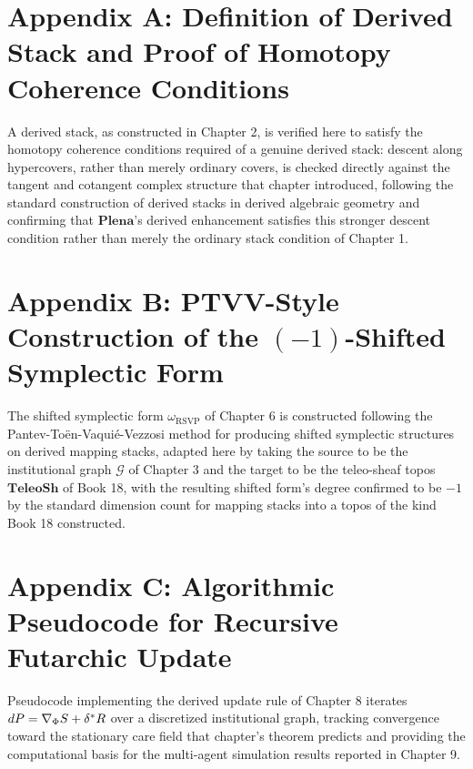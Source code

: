 \chapter*{Appendix A: Definition of Derived Stack and Proof of Homotopy Coherence Conditions}

A derived stack, as constructed in Chapter 2, is verified here to satisfy the homotopy coherence conditions required of a genuine derived stack: descent along hypercovers, rather than merely ordinary covers, is checked directly against the tangent and cotangent complex structure that chapter introduced, following the standard construction of derived stacks in derived algebraic geometry and confirming that $\mathbf{Plena}$'s derived enhancement satisfies this stronger descent condition rather than merely the ordinary stack condition of Chapter 1.

\chapter*{Appendix B: PTVV-Style Construction of the $(-1)$-Shifted Symplectic Form}

The shifted symplectic form $\omega_{\mathrm{RSVP}}$ of Chapter 6 is constructed following the Pantev-Toën-Vaquié-Vezzosi method for producing shifted symplectic structures on derived mapping stacks, adapted here by taking the source to be the institutional graph $\mathcal{G}$ of Chapter 3 and the target to be the teleo-sheaf topos $\mathbf{TeleoSh}$ of Book 18, with the resulting shifted form's degree confirmed to be $-1$ by the standard dimension count for mapping stacks into a topos of the kind Book 18 constructed.

\chapter*{Appendix C: Algorithmic Pseudocode for Recursive Futarchic Update}

Pseudocode implementing the derived update rule of Chapter 8 iterates $dP = \nabla_{\Phi}S + \delta^{*}R$ over a discretized institutional graph, tracking convergence toward the stationary care field that chapter's theorem predicts and providing the computational basis for the multi-agent simulation results reported in Chapter 9.

